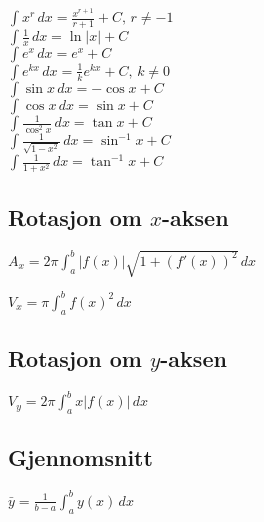 \documentclass[a4paper,7pt,fleqn]{article}
\begin{document}
\begin{multicols}{2}
\begin{minipage}{\linewidth}
\(\int x^r \, dx = \frac{x^{r+1}}{r+1} + C, \, r \neq -1\) \\
\(\int \frac{1}{x} \, dx = \ln|x| + C\) \\
\(\int e^x \, dx = e^x + C\) \\
\(\int e^{kx} \, dx = \frac{1}{k} e^{kx} + C, \, k \neq 0\) \\
\(\int \sin x \, dx = -\cos x + C\) \\
\(\int \cos x \, dx = \sin x + C\) \\
\(\int \frac{1}{\cos^2 x} \, dx = \tan x + C\) \\
\(\int \frac{1}{\sqrt{1 - x^2}} \, dx = \sin^{-1} x + C\) \\
\(\int \frac{1}{1 + x^2} \, dx = \tan^{-1} x + C\)
\end{minipage}

\subsection{Rotasjon om \(x\)-aksen}  

\( A_x = 2\pi \int_{a}^{b} |f(x)| \sqrt{1 + (f'(x))^2} \,dx \)  

\( V_x = \pi \int_{a}^{b} f(x)^2 \,dx \)  

\subsection{Rotasjon om \(y\)-aksen}  

\( V_y = 2\pi \int_{a}^{b} x |f(x)| \,dx \)  

\subsection{Gjennomsnitt}  

\( \bar{y} = \frac{1}{b-a} \int_{a}^{b} y(x) \,dx \)  



\end{multicols}
\end{document}
